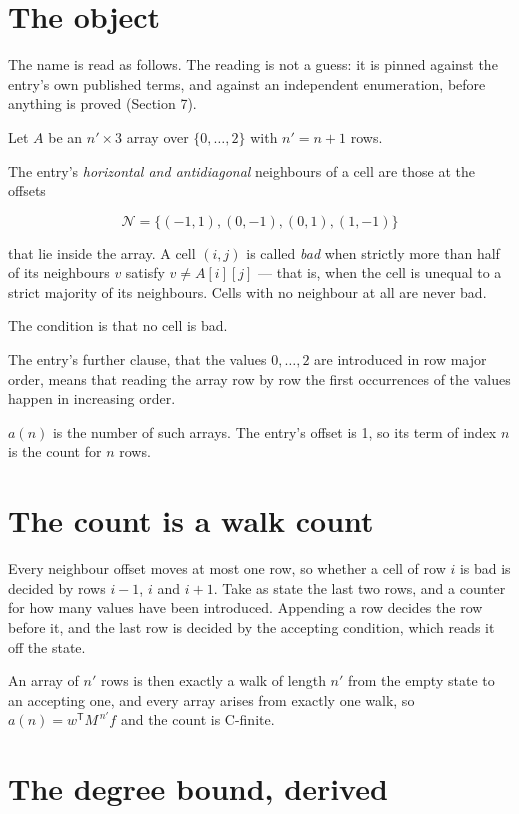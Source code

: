 \documentclass[11pt]{article}
\theoremstyle{definition}
\begin{document}
\section{The object}

The name is read as follows. The reading is not a guess: it is pinned against the entry's own published terms, and against an independent enumeration, before anything is proved (Section 7).

Let $A$ be an $n' \times 3$ array over $\{0,\dots,2\}$ with $n' = n + 1$ rows.

The entry's {\itshape horizontal and antidiagonal} neighbours of a cell are those at the offsets

\[\mathcal{N} = \{(-1,1), (0,-1), (0,1), (1,-1)\}\]

that lie inside the array. A cell $(i,j)$ is called {\itshape bad} when strictly more than half of its neighbours $v$ satisfy $v \ne A[i][j]$ --- that is, when the cell is unequal to a strict majority of its neighbours. Cells with no neighbour at all are never bad.

The condition is that no cell is bad.

The entry's further clause, that the values $0,\dots,2$ are introduced in row major order, means that reading the array row by row the first occurrences of the values happen in increasing order.

$a(n)$ is the number of such arrays. The entry's offset is 1, so its term of index $n$ is the count for $n$ rows.

\section{The count is a walk count}

Every neighbour offset moves at most one row, so whether a cell of row $i$ is bad is decided by rows $i-1$, $i$ and $i+1$. Take as state the last two rows, and a counter for how many values have been introduced. Appending a row decides the row before it, and the last row is decided by the accepting condition, which reads it off the state.

An array of $n'$ rows is then exactly a walk of length $n'$ from the empty state to an accepting one, and every array arises from exactly one walk, so $a(n) = w^{\mathsf T}M^{\,n'}f$ and the count is C-finite.

\section{The degree bound, derived}
\end{document}
